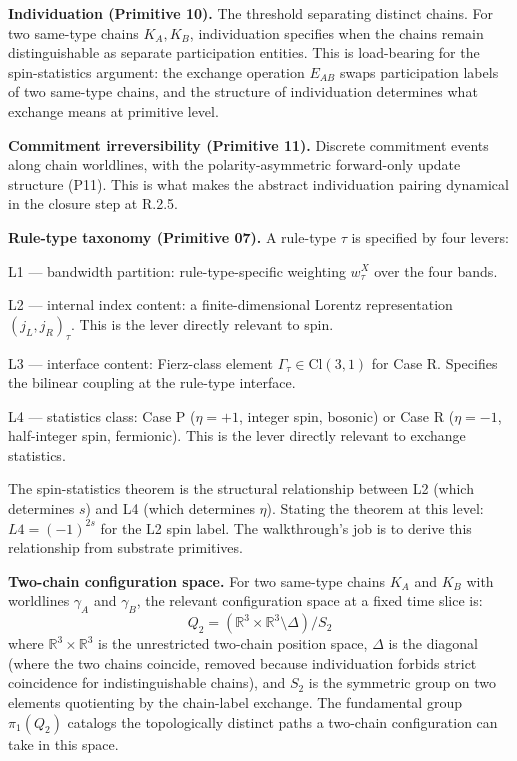 \documentclass[11pt,a4paper]{article}
\begin{document}
\textbf{Individuation (Primitive 10).} The threshold separating distinct chains. For two same-type chains $K_A, K_B$, individuation specifies when the chains remain distinguishable as separate participation entities. This is load-bearing for the spin-statistics argument: the exchange operation $E_{AB}$ swaps participation labels of two same-type chains, and the structure of individuation determines what exchange means at primitive level.

\textbf{Commitment irreversibility (Primitive 11).} Discrete commitment events along chain worldlines, with the polarity-asymmetric forward-only update structure (P11). This is what makes the abstract individuation pairing dynamical in the closure step at R.2.5.

\textbf{Rule-type taxonomy (Primitive 07).} A rule-type $\tau$ is specified by four levers:

L1 --- bandwidth partition: rule-type-specific weighting $w_\tau^X$ over the four bands.

L2 --- internal index content: a finite-dimensional Lorentz representation $(j_L, j_R)_\tau$. This is the lever directly relevant to spin.

L3 --- interface content: Fierz-class element $\Gamma_\tau \in \mathrm{Cl}(3,1)$ for Case R. Specifies the bilinear coupling at the rule-type interface.

L4 --- statistics class: Case P ($\eta = +1$, integer spin, bosonic) or Case R ($\eta = -1$, half-integer spin, fermionic). This is the lever directly relevant to exchange statistics.

The spin-statistics theorem is the structural relationship between L2 (which determines $s$) and L4 (which determines $\eta$). Stating the theorem at this level: $L4 = (-1)^{2s}$ for the L2 spin label. The walkthrough's job is to derive this relationship from substrate primitives.

\textbf{Two-chain configuration space.} For two same-type chains $K_A$ and $K_B$ with worldlines $\gamma_A$ and $\gamma_B$, the relevant configuration space at a fixed time slice is:
\[
Q_2 = (\mathbb{R}^{3} \times \mathbb{R}^{3} \setminus \Delta) / S_2
\]
where $\mathbb{R}^{3} \times \mathbb{R}^{3}$ is the unrestricted two-chain position space, $\Delta$ is the diagonal (where the two chains coincide, removed because individuation forbids strict coincidence for indistinguishable chains), and $S_2$ is the symmetric group on two elements quotienting by the chain-label exchange. The fundamental group $\pi_1(Q_2)$ catalogs the topologically distinct paths a two-chain configuration can take in this space.
\end{document}
